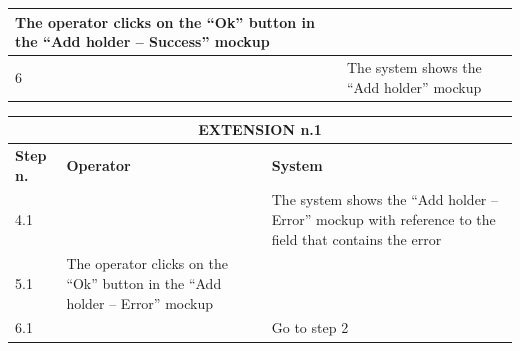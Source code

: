{{{\begin{table}[h]
\begin{tabular}{|p{2cm}|p{6cm}|p{6cm}|}
				\vspace{1mm} The operator clicks on the “Ok” button in the “Add holder – Success”  mockup \vspace{1mm} & 
				\vspace{1mm} \vspace{1mm} \\
			\hline
				\vspace{1mm} 6 \vspace{1mm} &
				\vspace{1mm} \vspace{1mm} & 
				\vspace{1mm} The system shows the “Add holder”  mockup \vspace{1mm} \\
			\hline
			\end{tabular}
			\end{table}
			
			\begin{table}[h]
			\begin{tabular}{|p{2cm}|p{6cm}|p{6cm}|}
			\hline
				\multicolumn{3}{|c|}{EXTENSION n.1}\\
			\hline
				\centering \vspace{1mm} \bfseries{Step n.} \vspace{1mm} & \vspace{1mm} \bfseries{Operator} \vspace{1mm} & \vspace{1mm} \bfseries{System} \vspace{1mm}\\
			\hline
				\vspace{1mm} 4.1 \vspace{1mm} &
				\vspace{1mm} \vspace{1mm} & 
				\vspace{1mm} The system shows the “Add holder – Error”  mockup with reference to the field that contains the error \vspace{1mm} \\
			\hline
				\vspace{1mm} 5.1\vspace{1mm} &
				\vspace{1mm} The operator clicks on the “Ok” button in the “Add holder – Error”  mockup \vspace{1mm} & 
				\vspace{1mm} \vspace{1mm} \\
			\hline
				\vspace{1mm} 6.1\vspace{1mm} &
				\vspace{1mm} \vspace{1mm} & 
				\vspace{1mm} Go to step 2\vspace{1mm} \\
			\hline
			\end{tabular}
			\end{table}
			
}}}
